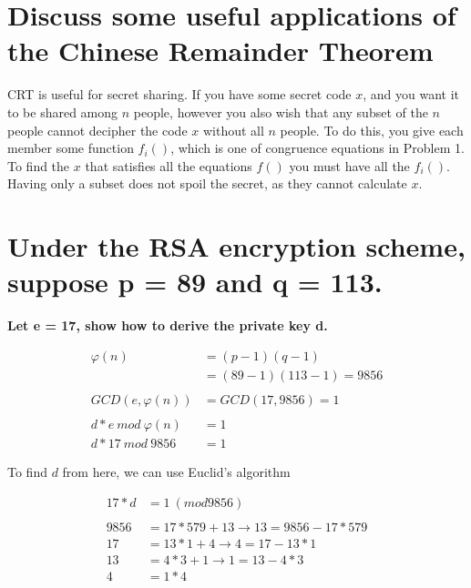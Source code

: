 \documentclass[letterpaper]{article}
\begin{document}
\section{Discuss some useful applications of the Chinese Remainder Theorem}

CRT is useful for secret sharing. If you have some secret code \(x\), and you want it to be shared among \(n\) people, however you also wish that any subset of the \(n\) people cannot decipher the code \(x\) without all \(n\) people. To do this, you give each member some function \(f_i()\), which is one of congruence equations in Problem 1. To find the \(x\) that satisfies all the equations \(f()\) you must have all the \(f_i()\). Having only a subset does not spoil the secret, as they cannot calculate \(x\).

\section{Under the RSA encryption scheme, suppose p = 89 and q = 113.}

\textbf{Let e = 17, show how to derive the private key d.}

\begin{equation*}
  \begin{split}
\varphi(n) &= (p -1)(q -1) \\
& =(89 - 1)(113 - 1) = 9856 \\
\\
GCD(e, \varphi(n)) &= GCD(17, 9856) = 1 \\
\\
d*e\ mod\ \varphi(n) &= 1 \\
d*17\ mod\ 9856 &= 1
  \end{split}
\end{equation*}

To find \(d\) from here, we can use Euclid's algorithm

\begin{equation*}
  \begin{split}
17*d &= 1\ (mod 9856) \\
\\
9856 &= 17*579 + 13 \rightarrow 13 = 9856 - 17*579 \\
17 &= 13*1 + 4 \rightarrow 4  = 17 - 13*1 \\
13 &= 4*3 + 1 \rightarrow 1 = 13 - 4*3 \\
4 &= 1*4
  \end{split}
\end{equation*}
\end{document}
